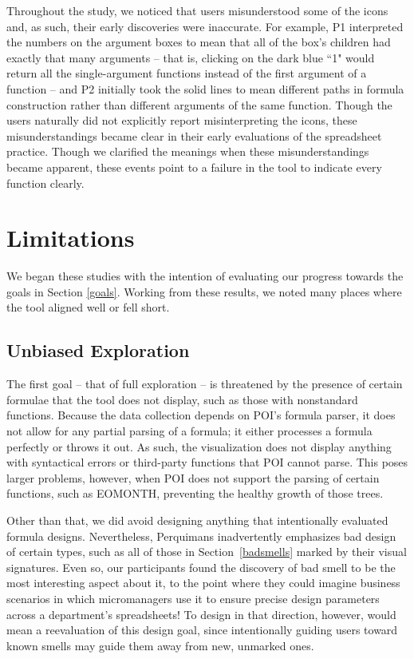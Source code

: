 \documentclass[conference]{IEEEtran}
\newcommand{\toolname}{Perquimans } \newcommand{\toolnameend}{Perquimans}
\begin{document}
	Throughout the study, we noticed that users misunderstood some of the icons
	and, as such, their early discoveries were inaccurate. For example, P1
	interpreted the numbers on the argument boxes to mean that all of the box's
	children had exactly that many arguments -- that is, clicking on the dark blue
	``1" would return all the single-argument functions instead of the first
	argument of a function -- and P2 initially took the solid lines to mean
	different paths in formula construction rather than different arguments of the
	same function. Though the users naturally did not explicitly report
	misinterpreting the icons, these misunderstandings became clear in their early
	evaluations of the spreadsheet practice. Though we clarified the meanings when
	these misunderstandings became apparent, these events point to a failure in the
	tool to indicate every function clearly.   \par
	
	
	\section{Limitations} We began these studies with the intention of evaluating
	our progress towards the goals in Section \ref{goals}. Working from these
	results, we noted many places where the tool aligned well or fell short.
	
	\subsection{Unbiased Exploration} The first goal -- that of full exploration --
	is threatened by the presence of certain formulae that the tool does not
	display, such as those with nonstandard functions. Because the data collection
	depends on POI's formula parser, it does not allow for any partial parsing of a
	formula; it either processes a formula perfectly or throws it out. As such, the
	visualization does not display anything with syntactical errors or third-party
	functions that POI cannot parse. This poses larger problems, however, when POI
	does not support the parsing of certain functions, such as EOMONTH, preventing
	the healthy growth of those trees. \par
	
	Other than that, we did avoid designing anything that intentionally evaluated
	formula designs. Nevertheless, \toolname inadvertently emphasizes bad design of
	certain types, such as all of those in Section~\ref{badsmells} marked by their
	visual signatures. Even so, our participants found the discovery of bad smell
	to be the most interesting aspect about it, to the point where they could
	imagine business scenarios in which micromanagers use it to ensure precise
	design parameters across a department's spreadsheets! To design in that
	direction, however, would mean a reevaluation of this design goal, since
	intentionally guiding users toward known smells may guide them away from new,
	unmarked ones.
	
\end{document}
